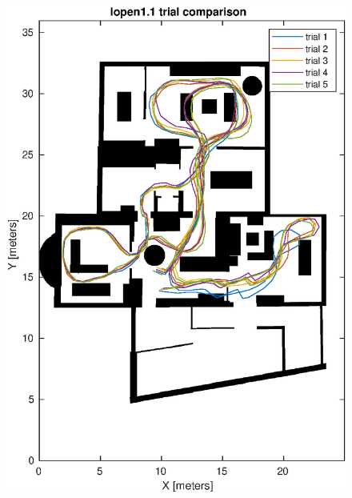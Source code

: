 \begin{figure}[H]
	\centering
	\begin{minipage}{.45\textwidth}
		\centering
		\includegraphics[width=\linewidth]{images/20201107_1142_trial_comparison_1}
		\caption{}
		\label{fig:202011071142trialcomparison1}
	\end{minipage}
\begin{minipage}{.45\textwidth}
	\centering

\end{minipage}
\end{figure}
